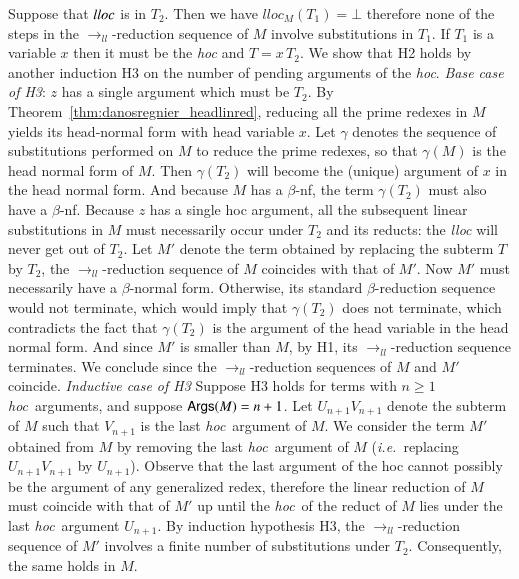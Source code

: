 \documentclass{elsarticle}
\makeatletter
\theoremstyle{plain}
\theoremstyle{definition}
\renewcommand\ie{{\it i.e.\@\xspace}}
\newcommand{\llred}{\rightarrow_{ll}}
\newcommand{\hoc}{\emph{hoc}}
\makeatother
\begin{document}
    Suppose that $\emph{lloc}$ is in $T_2$. Then we have $lloc_M(T_1) =\bot$ therefore none of the steps in the $\llred$-reduction sequence of $M$ involve substitutions in $T_1$.
    If $T_1$ is a variable $x$ then it must be the \emph{hoc} and $T = x\,T_2$.
    We show that H2 holds by another induction H3 on the number of pending arguments of the \emph{hoc}.
    \emph{Base case of H3}: $z$ has a single argument which must be $T_2$.
    By Theorem~\ref{thm:danosregnier_headlinred}, reducing all the prime redexes in $M$ yields its head-normal form
    with head variable $x$.
    Let $\gamma$ denotes the sequence of substitutions performed on $M$ to reduce the prime redexes, so that $\gamma(M)$ is the head normal form of $M$.  Then $\gamma(T_2)$ will become the (unique) argument of $x$ in the head normal form. And because $M$ has a $\beta$-nf, the term $\gamma(T_2)$ must also have a $\beta$-nf.
    Because $z$ has a single hoc argument, all the subsequent linear substitutions in $M$ must necessarily occur under $T_2$ and its reducts: the \emph{lloc} will never get out of $T_2$.
    Let $M'$ denote the term obtained by replacing
    the subterm $T$ by $T_2$, the $\llred$-reduction sequence of $M$ coincides with that of $M'$.
    Now $M'$ must necessarily have a $\beta$-normal form. Otherwise, its standard $\beta$-reduction sequence would not terminate, which would imply that $\gamma(T_2)$ does not terminate, which contradicts the fact that $\gamma(T_2)$ is the argument of the head variable in the head normal form.
    And since $M'$ is smaller than $M$, by H1, its $\llred$-reduction sequence terminates. We conclude since the $\llred$-reduction sequences of $M$ and $M'$ coincide.
     \emph{Inductive case of H3} Suppose H3  holds for terms with $n \geq 1$ \hoc\ arguments, and suppose ${\sf Args}(M) = n+1$.
    Let $U_{n+1} V_{n+1}$ denote the subterm of $M$ such that $V_{n+1}$ is the last \hoc\ argument of $M$. We consider the term $M'$ obtained from $M$ by removing the last \hoc\ argument of $M$ (\ie~replacing $U_{n+1} V_{n+1}$ by $U_{n+1}$).
    Observe that the last argument of the hoc cannot possibly be the argument of any generalized redex, therefore the linear reduction of $M$ must  coincide with that of $M'$ up until the \hoc\ of the reduct of $M$ lies under the last \hoc\ argument $U_{n+1}$.
%
    By induction hypothesis H3, the $\llred$-reduction sequence of $M'$ involves a finite number of substitutions under $T_2$. Consequently, the same holds in $M$.
\end{document}
